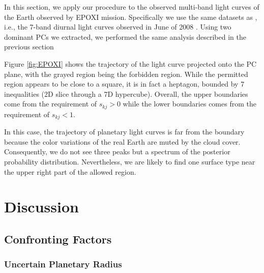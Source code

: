 \documentclass[iop,numberedappendix,apj,]{emulateapj}
\begin{document}



In this section, we apply our procedure to the observed multi-band light curves of the Earth observed by EPOXI mission. 
Specifically we use the same datasets as \citet{Cowan2013}, i.e., the 7-band diurnal light curves observed in June of 2008 \citep{Livengood2011}. 
Using two dominant PCs we extracted, we performed the same analysis described in the previous section 

Figure \ref{fig:EPOXI} shows the trajectory of the light curve projected onto the PC plane, with the grayed region being the forbidden region. 
While the permitted region appears to be close to a square, it is in fact a heptagon, bounded by 7 inequalities (2D slice through a 7D hypercube). 
Overall, the upper boundaries come from the requirement of $s_{kj}>0$ while the lower boundaries comes from the requirement of $s_{kj}<1$. 

In this case, the trajectory of planetary light curves is far from the boundary because the color variations of the real Earth are muted by the cloud cover. 
Consequently, we do not see three peaks but a spectrum of the posterior probability distribution. 
Nevertheless, we are likely to find one surface type near the upper right part of the allowed region. 




\section{Discussion}
\label{s:discussion}

\subsection{Confronting Factors}
\label{ss:confonting_factors}


\subsubsection{Uncertain Planetary Radius}

\end{document}
